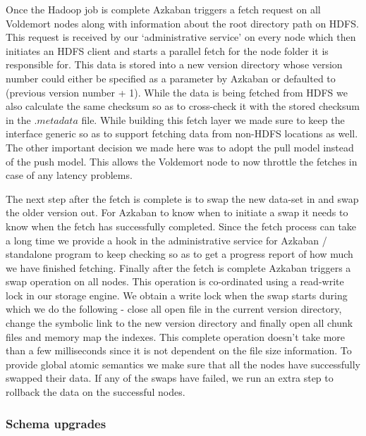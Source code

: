 \documentclass[10pt,twocolumn,preprint,natbib,authoryear]{sigplanconf}
\begin{document}
Once the Hadoop job is complete Azkaban triggers a fetch request on all Voldemort nodes along with information about the root directory path on HDFS. This request is received by our `administrative service' on every node which then initiates an HDFS client and starts a parallel fetch for the node folder it is responsible for. This data is stored into a new version directory whose version number could either be specified as a parameter by Azkaban or defaulted to (previous version number + 1). While the data is being fetched from HDFS we also calculate the same checksum so as to cross-check it with the stored checksum in the $.metadata$ file. While building this fetch layer we made sure to keep the interface generic so as to support fetching data from non-HDFS locations as well. The other important decision we made here was to adopt the pull model instead of the push model. This allows the Voldemort node to now throttle the fetches in case of any latency problems. 

The next step after the fetch is complete is to swap the new data-set in and swap the older version out. For Azkaban to know when to initiate a swap it needs to know when the fetch has successfully completed. Since the fetch process can take a long time we provide a hook in the administrative service for Azkaban / standalone program to keep checking so as to get a progress report of how much we have finished fetching. Finally after the fetch is complete Azkaban triggers a swap operation on all nodes. This operation is co-ordinated using a read-write lock in our storage engine. We obtain a write lock when the swap starts during which we do the following - close all open file in the current version directory, change the symbolic link to the new version directory and finally open all chunk files and memory map the indexes. This complete operation doesn't take more than a few milliseconds since it is not dependent on the file size information. To provide global atomic semantics we make sure that all the nodes have successfully swapped their data. If any of the swaps have failed, we run an extra step to rollback the data on the successful nodes.



\subsubsection{Schema upgrades}
\label{sec:read_only:data_cycle:schema_upgrades}
\end{document}
